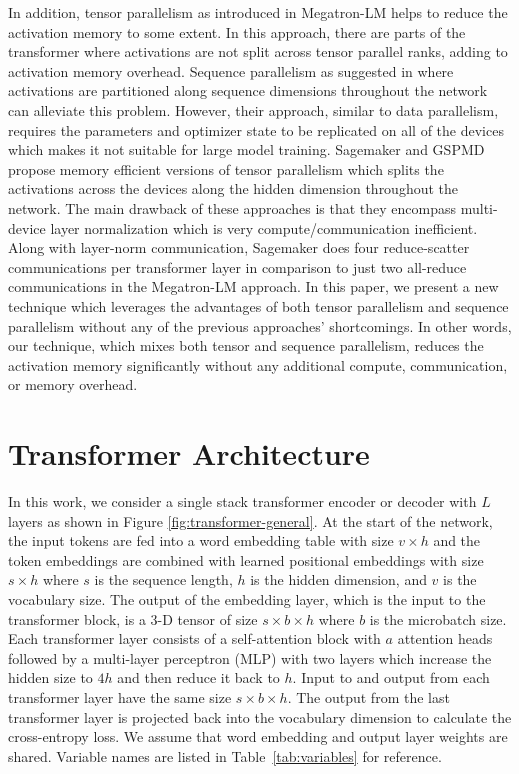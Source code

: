 \documentclass{article}
\begin{document}
In addition, tensor parallelism as introduced in Megatron-LM \cite{megatron} helps to reduce the activation memory to some extent. In this approach, there are parts of the transformer where activations are not split across tensor parallel ranks, adding to activation memory overhead. Sequence parallelism as suggested in \cite{sequence-parallelism} where activations are partitioned along sequence dimensions throughout the network can alleviate this problem. However, their approach, similar to data parallelism, requires the parameters and optimizer state to be replicated on all of the devices which makes it not suitable for large model training. Sagemaker \cite{sagemaker} and GSPMD \cite{GSPMD} propose memory efficient versions of tensor parallelism which splits the activations across the devices along the hidden dimension throughout the network. The main drawback of these approaches is that they encompass multi-device layer normalization which is very compute/communication inefficient. Along with layer-norm communication, Sagemaker \cite{sagemaker} does four reduce-scatter communications per transformer layer in comparison to just two all-reduce communications in the Megatron-LM approach. %
In this paper, we present a new technique which leverages the advantages of both tensor parallelism and sequence parallelism without any of the previous approaches' shortcomings. In other words, our technique, which mixes both tensor and sequence parallelism, reduces the activation memory significantly without any additional compute, communication, or memory overhead.


\section{Transformer Architecture}
\label{sec:transformer-arch}

In this work, we consider a single stack transformer encoder or decoder with $L$ layers as shown in Figure \ref{fig:transformer-general}. At the start of the network, the input tokens are fed into a word embedding table with size $v \times h$ and the token embeddings are combined with learned positional embeddings with size $s \times h$ where $s$ is the sequence length, $h$ is the hidden dimension, and $v$ is the vocabulary size. The output of the embedding layer, which is the input to the transformer block, is a 3-D tensor of size $s \times b \times h$ where $b$ is the microbatch size. Each transformer layer consists of a self-attention block with $a$ attention heads followed by a multi-layer perceptron (MLP) with two layers which increase the hidden size to $4h$ and then reduce it back to $h$. Input to and output from each transformer layer have the same size $s \times b \times h$. The output from the last transformer layer is projected back into the vocabulary dimension to calculate the cross-entropy loss. We assume that word embedding and output layer weights are shared. Variable names are listed in Table~\ref{tab:variables} for reference.
\end{document}
